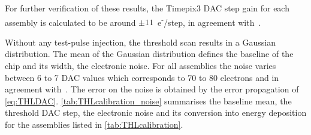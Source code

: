 For further verification of these results, the Timepix3 DAC step gain
for each assembly is calculated to be around
$\pm11$~e\textsuperscript{-}/step, in agreement
with~\cite{Timepix3Poikela}.

Without any test-pulse injection, the threshold scan results in a
Gaussian distribution. The mean of the Gaussian distribution defines
the baseline of the chip and its width, the electronic noise. For all
assemblies the noise varies between 6 to 7 DAC values which
corresponds to 70 to 80 electrons and in agreement
with~\cite{art:tmpx}. The error on the noise is obtained by the error
propagation of \cref{eq:THLDAC}. \cref{tab:THLcalibration_noise}
summarises the baseline mean, the threshold DAC step, the electronic
noise and its conversion into energy deposition for the assemblies
listed in \cref{tab:THLcalibration}.



\begin{table}[htbp]
  \centering
  \caption{Measured baseline mean, threshold DAC step gain, the electronic noise
    and its conversion into energy deposition.}
  \label{tab:THLcalibration_noise}
\end{table}

